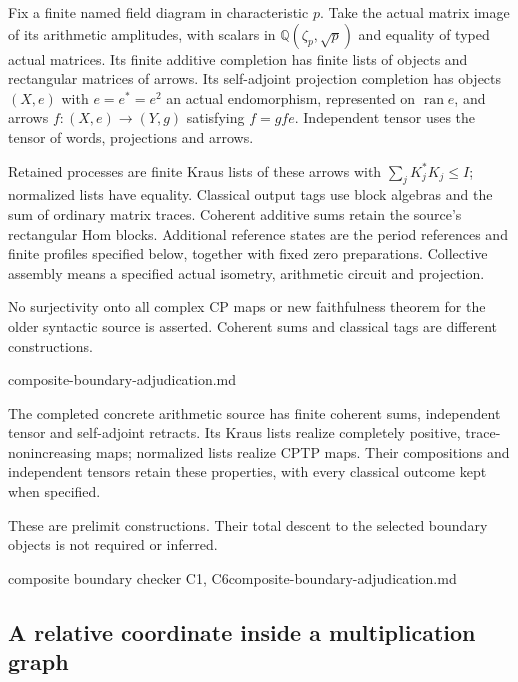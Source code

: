 \begin{definition}
Fix a finite named field diagram in characteristic $p$. Take the actual
matrix image of its arithmetic amplitudes, with scalars in
$\mathbb Q(\zeta_p,\sqrt p)$ and equality of typed actual matrices.
Its finite additive completion has finite lists of objects and rectangular
matrices of arrows. Its self-adjoint projection completion has objects
$(X,e)$ with $e=e^*=e^2$ an actual endomorphism, represented on
$\operatorname{ran}e$, and arrows $f:(X,e)\to(Y,g)$ satisfying $f=gfe$.
Independent tensor uses the tensor of words, projections and arrows.

Retained processes are finite Kraus lists of these arrows with
$\sum_jK_j^*K_j\leq I$; normalized lists have equality. Classical output
tags use block algebras and the sum of ordinary matrix traces. Coherent
additive sums retain the source's rectangular Hom blocks. Additional
reference states are the period references and finite profiles specified
below, together with fixed zero preparations. Collective assembly means
a specified actual isometry, arithmetic circuit and projection.
\end{definition}
\begin{scope}
No surjectivity onto all complex CP maps or new faithfulness theorem for
the older syntactic source is asserted. Coherent sums and classical tags
are different constructions.
\end{scope}
{composite-boundary-adjudication.md}

\begin{proposition}
\statusProved\quad
The completed concrete arithmetic source has finite coherent sums,
independent tensor and self-adjoint retracts. Its Kraus lists realize
completely positive, trace-nonincreasing maps; normalized lists realize
CPTP maps. Their compositions and independent tensors retain these
properties, with every classical outcome kept when specified.
\end{proposition}
\begin{scope}
These are prelimit constructions. Their total descent to the selected
boundary objects is not required or inferred.
\end{scope}
{composite boundary checker C1, C6}{composite-boundary-adjudication.md}

\subsection{A relative coordinate inside a multiplication graph}

